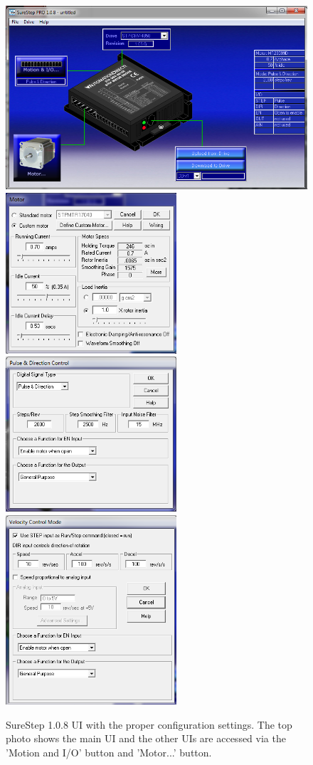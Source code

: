 \documentclass[11pt]{article}
\begin{document}
\begin{figure}[h]
\begin{center}
\includegraphics[width = 5in]{MotorConfiguration.png}
\includegraphics[width = 2.5in]{MotorConfig2.png}
\includegraphics[width = 2.5in]{MotorConfig3.png}
\includegraphics[width = 2.5in]{MotorConfig4.png}
\caption{SureStep 1.0.8 UI with the proper configuration settings.  The top photo shows the main UI and the other UIs are accessed via the 'Motion and I/O' button and 'Motor...' button.}  
\label{ConfigPic}
\end{center}
\end{figure}
\end{document}
